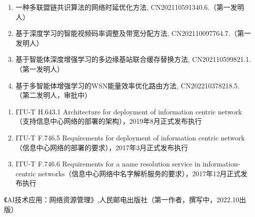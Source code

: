 \documentclass{resume}
\begin{document}
\begin{enumerate}
    \item 一种多联盟链共识算法的网络时延优化方法, CN202110591340.6.（第一发明人）
    \item 基于深度学习的智能视频码率调整及带宽分配方法, CN202110097764.7.（第一发明人）
    \item 基于智能体深度增强学习的多边缘基站联合缓存替换方法, CN202110599821.1.（第一发明人）
    \item 基于多智能体增强学习的WSN能量效率优化路由方法, CN202210378218.5.（第二发明人，审批中）
\end{enumerate}
\begin{enumerate}
    \item ITU-T H.643.1 Architecture for deployment of information centric network（支持信息中心网络的部署的架构），2019年8月正式发布执行
    \item ITU-T F.746.5 Requirements for deployment of information centric network（信息中心网络的部署的要求），2017年3月正式发布执行
    \item ITU-T F.746.6 Requirements for a name resolution service in information-centric networks（信息中心网络中名字解析服务的要求），2017年12月正式发布执行
\end{enumerate}
《AI技术应用：网络资源管理》,人民邮电出版社（第一作者，撰写中，2022.10出版）

\end{document}

